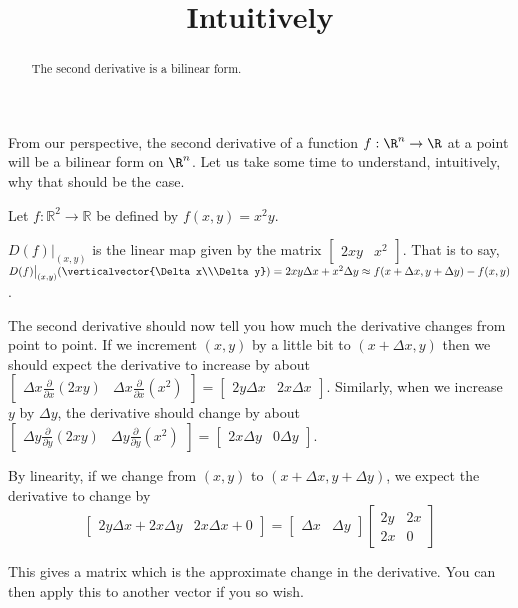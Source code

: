 \documentclass{ximera}
\title{Intuitively}
\begin{document}
\begin{abstract}
	The second derivative is a bilinear form.
\end{abstract}
	
	From our perspective, the second derivative of a function $f: \R^n \to \R$ at a point will be a bilinear form on $\R^n$.  
	Let us take some time to understand, intuitively, why that should be the case.
	
	Let $f:\mathbb{R}^2 \to \mathbb{R}$ be defined by $f(x,y) = x^2y$.

$D(f)\big|_{(x,y)}$ is the linear map given by the matrix $\left[ \begin{matrix} 2xy&x^2\end{matrix} \right]$.  
That is to say, $D(f)\big|_{(x,y)}(\verticalvector{\Delta x\\\Delta y}) = 2xy\Delta x + x^2\Delta y \approx f(x+\Delta x,y+\Delta y) - f(x,y)$.  

The second derivative should now tell you how much the derivative changes from point to point.  
If we increment $(x,y)$ by a little bit to $(x+\Delta x,y)$ then we should expect the derivative to 
increase by about $\begin{bmatrix} \Delta x \frac{\partial}{ \partial x} ( 2xy) & \Delta x\frac{\partial}{\partial x}(x^2) \end{bmatrix} = \begin{bmatrix} 2y\Delta x&2x \Delta x\end{bmatrix}$.  
Similarly, when we increase $y$ by $\Delta y$, the derivative should change by about 
$\begin{bmatrix} \Delta y \frac{\partial}{ \partial y} ( 2xy) & \Delta y\frac{\partial}{\partial y}(x^2) \end{bmatrix} = \begin{bmatrix} 2x \Delta y&0\Delta y\end{bmatrix}$.

By linearity, if we change from $(x,y)$ to $(x+\Delta x,y+\Delta y)$, 
we expect the derivative to change by
 \[\begin{bmatrix} 2y\Delta x + 2x\Delta y & 2x\Delta x + 0 \end{bmatrix}  = \begin{bmatrix} \Delta x&\Delta y\end{bmatrix} \begin{bmatrix} 2y&2x\\2x&0\end{bmatrix} \]

This gives a matrix which is the approximate change in the derivative.  You can then apply this to another vector if you so wish.  
\end{document}

